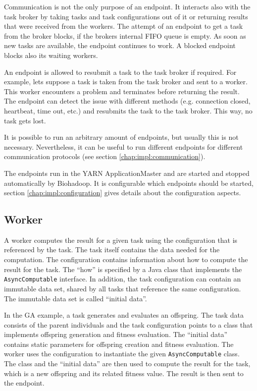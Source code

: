 Communication is not the only purpose of an endpoint. It interacts also with the task broker by taking tasks and task configurations out of it or returning results that were received from the workers. The attempt of an endpoint to get a task from the broker blocks, if the brokers internal FIFO queue is empty. As soon as new tasks are available, the endpoint continues to work. A blocked endpoint blocks also its waiting workers.

An endpoint is allowed to resubmit a task to the task broker if required. For example, lets suppose a task is taken from the task broker and sent to a worker. This worker encounters a problem and terminates before returning the result. The endpoint can detect the issue with different methods (e.g. connection closed, heartbeat, time out, etc.) and resubmits the task to the task broker. This way, no task gets lost.

It is possible to run an arbitrary amount of endpoints, but usually this is not necessary. Nevertheless, it can be useful to run different endpoints for different communication protocols (see section \ref{chap:impl:communication}).

The endpoints run in the YARN ApplicationMaster and are started and stopped automatically by Biohadoop. It is configurable which endpoints should be started, section \ref{chap:impl:configuration} gives details about the configuration aspects.

\subsection{Worker}
\label{chap:impl:worker}
A worker computes the result for a given task using the configuration that is referenced by the task. The task itself contains the data needed for the computation. The configuration contains information about how to compute the result for the task. The ``how'' is specified by a Java class that implements the \texttt{AsyncComputable} interface. In addition, the task configuration can contain an immutable data set, shared by all tasks that reference the same configuration. The immutable data set is called  ``initial data''.

In the GA example, a task generates and evaluates an offspring. The task data consists of the parent individuals and the task configuration points to a class that implements offspring generation and fitness evaluation. The ``initial data'' contains static parameters for offspring creation and fitness evaluation. The worker uses the configuration to instantiate the given \texttt{AsyncComputable} class. The class and the ``initial data'' are then used to compute the result for the task, which is a new offspring and its related fitness value. The result is then sent to the endpoint.

